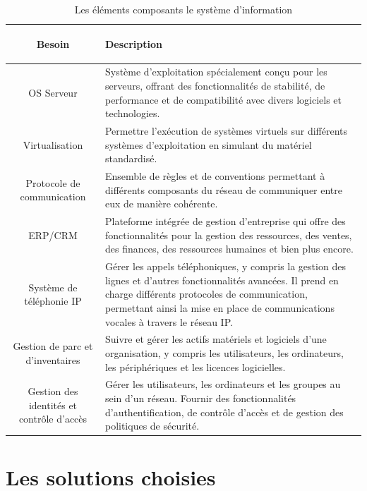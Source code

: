 \begin{table}[H]
\begin{center}
\begin{tabular}{|c{3cm}|l{10cm}|}
\hline
\textbf{Besoin} & \begin{center} \textbf{Description} \end{center} \\
\hline
OS Serveur & Système d'exploitation spécialement conçu pour les serveurs, offrant des fonctionnalités de stabilité, de performance et de compatibilité avec divers logiciels et technologies. \\
\hline
Virtualisation & Permettre l'exécution de systèmes virtuels sur différents systèmes d'exploitation en simulant du matériel standardisé. \\
\hline
Protocole de communication & Ensemble de règles et de conventions permettant à différents composants du réseau de communiquer entre eux de manière cohérente. \\
\hline
ERP/CRM & Plateforme intégrée de gestion d'entreprise qui offre des fonctionnalités pour la gestion des ressources, des ventes, des finances, des ressources humaines et bien plus encore. \\
\hline
Système de téléphonie IP & Gérer les appels téléphoniques, y compris la gestion des lignes et d'autres fonctionnalités avancées. Il prend en charge différents protocoles de communication, permettant ainsi la mise en place de communications vocales à travers le réseau IP. \\
\hline
Gestion de parc et d'inventaires & Suivre et gérer les actifs matériels et logiciels d'une organisation, y compris les utilisateurs, les ordinateurs, les périphériques et les licences logicielles. \\
\hline
Gestion des identités et contrôle d'accès & Gérer les utilisateurs, les ordinateurs et les groupes au sein d'un réseau. Fournir des fonctionnalités d'authentification, de contrôle d'accès et de gestion des politiques de sécurité. \\
\hline
\end{tabular}
\caption{Les éléments composants le système d'information}
\label{1}
\end{center}
\end{table}


\section{Les solutions choisies}

